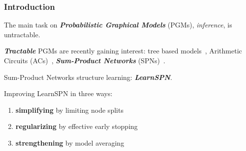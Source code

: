 \documentclass[xcolor={usenames,dvipsnames,svgnames}, compress]{beamer}
\begin{document}
\begin{frame}
  \frametitle{Introduction}
  \footnotesize
  The main task on \emph{\textbf{Probabilistic Graphical Models}} (PGMs), \emph{inference}, is untractable.\par\bigskip
  
  \emph{\textbf{Tractable}} PGMs are recently gaining interest: tree based models~\parencite{Meila2000}, Arithmetic Circuits (ACs)~\parencite{Rooshenas2014},
  \emph{\textbf{Sum-Product Networks}}
  (SPNs)~\parencite{Poon2011a}.\par\bigskip

  Sum-Product Networks structure learning: \emph{\textbf{LearnSPN}}.\par\bigskip

  Improving LearnSPN in three ways:
  \begin{enumerate}[I]
  \item \textbf{simplifying} by limiting node splits 
  \item \textbf{regularizing} by effective early stopping
  \item \textbf{strengthening} by model averaging 
  \end{enumerate}
\end{frame}
\end{document}
